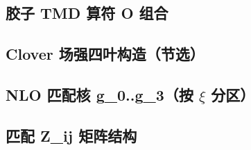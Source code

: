 \documentclass[UTF8]{ctexart}
\begin{document}
\subsection{胶子 TMD 算符 O 组合}


\subsection{Clover 场强四叶构造（节选）}


\subsection{NLO 匹配核 g\_0..g\_3（按 $\xi$ 分区）}


\subsection{匹配 Z\_ij 矩阵结构}


\end{document}
